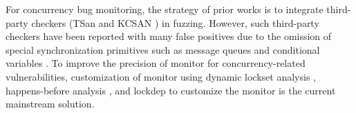 For concurrency bug monitoring, the strategy of prior works \cite{Chen2020MUZZTG,Johansson2018RandomTW,Vinesh2019ConFuzzACF} is to integrate third-party checkers (\eg TSan \cite{TSan} and KCSAN \cite{KCSAN}) in fuzzing. However, such third-party checkers have been reported with many false positives \cite{CONZZER2022context} due to the omission of special synchronization primitives such as message queues and conditional variables \cite{ThreadSanitizerDR}. To improve the precision of monitor for concurrency-related vulnerabilities, customization of monitor using dynamic lockset analysis \cite{Savage1997EraserAD,jeong2019razzer,xu2020krace,jeong2023segfuzz}, happens-before analysis \cite{happensbefore}, and lockdep \cite{lockdep} to customize the monitor is the current mainstream solution.


